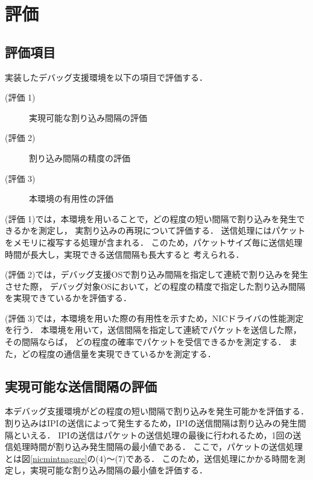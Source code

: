 \documentclass[submit,techreq,noauthor,dvipdfmx]{ipsj}
\begin{document}
\section{評価}\label{chap:evaluation}

\subsection{評価項目}\label{sec:item-of-evaluation}

実装したデバッグ支援環境を以下の項目で評価する．
\begin{description}
    \item[(評価 1)]実現可能な割り込み間隔の評価
    \item[(評価 2)]割り込み間隔の精度の評価
    \item[(評価 3)]本環境の有用性の評価
\end{description}

(評価 1)では，本環境を用いることで，どの程度の短い間隔で割り込みを発生できるかを測定し，
実割り込みの再現について評価する．
送信処理にはパケットをメモリに複写する処理が含まれる．
このため，パケットサイズ毎に送信処理時間が長大し，実現できる送信間隔も長大すると
考えられる．

(評価 2)では，デバッグ支援OSで割り込み間隔を指定して連続で割り込みを発生させた際，
デバッグ対象OSにおいて，どの程度の精度で指定した割り込み間隔を実現できているかを評価する．

(評価 3)では，本環境を用いた際の有用性を示すため，NICドライバの性能測定を行う．
本環境を用いて，送信間隔を指定して連続でパケットを送信した際，その間隔ならば，
どの程度の確率でパケットを受信できるかを測定する．
また，どの程度の通信量を実現できているかを測定する．

\subsection{実現可能な送信間隔の評価}\label{sec:interval}

本デバッグ支援環境がどの程度の短い間隔で割り込みを発生可能かを評価する．
割り込みはIPIの送信によって発生するため，IPIの送信間隔は割り込みの発生間隔といえる．
IPIの送信はパケットの送信処理の最後に行われるため，1回の送信処理時間が割り込み発生間隔の最小値である．
ここで，パケットの送信処理とは図\ref{nicmintnagare}の(4)〜(7)である．
このため，送信処理にかかる時間を測定し，実現可能な割り込み間隔の最小値を評価する．
\end{document}
